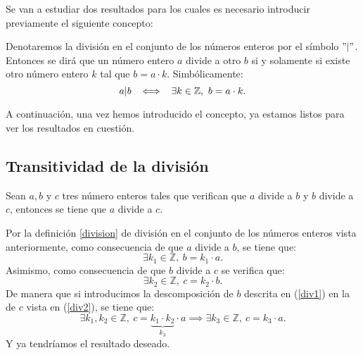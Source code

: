 Se van a estudiar dos resultados para los cuales es necesario introducir previamente el siguiente concepto:
\begin{definicion}\label{division}
	Denotaremos la división en el conjunto de los números enteros por el símbolo
	 \( "|" \). Entonces se dirá que un número entero \(a\) divide a otro \(b\)
	  si y solamente si existe otro número entero \(k\) tal que \(b=a\cdot k\).
	  Simbólicamente:
	  \begin{equation}
	  a|b \hspace{0.2cm} \iff \hspace{0.2cm} \exists k \in \mathbb{Z}, \ b=a\cdot k.
	  \end{equation}
\end{definicion}

A continuación, una vez hemos introducido el concepto, ya estamos listos para ver los resultados en cuestión.

\subsection{Transitividad de la división}
\begin{teorema}
	Sean \(a, b\) y \(c\) tres número enteros tales que verifican que \(a\) divide a
	\(b\) y \(b\) divide a \(c\), entonces se tiene que \(a\) divide a \(c\).
\end{teorema}
\begin{demostracion}
	Por la definición \ref{division} de división en el conjunto de los números enteros 
	vista anteriormente, como consecuencia de que \(a\) divide a \(b\), se tiene que:
	\begin{equation}\label{div1}
	\exists k_1 \in \mathbb{Z}, \ b=k_1 \cdot a.
	\end{equation}
	Asimismo, como consecuencia de que \(b\) divide a \(c\) se verifica que:
	\begin{equation}\label{div2}
	\exists k_2 \in \mathbb{Z}, \ c=k_2 \cdot b.
	\end{equation}
	De manera que si introducimos la descomposición de \(b\) descrita en (\ref{div1}) en la de \(c\) vista en (\ref{div2}), se tiene que:
	\begin{equation}
	\exists k_1, k_2 \in \mathbb{Z}, \ c=\underbrace{k_1 \cdot k_2}_{k_3} \cdot a \implies \exists k_3\in \mathbb{Z}, \ c=k_3 \cdot a .
	\end{equation}
	Y ya tendríamos el resultado deseado.
\end{demostracion}

